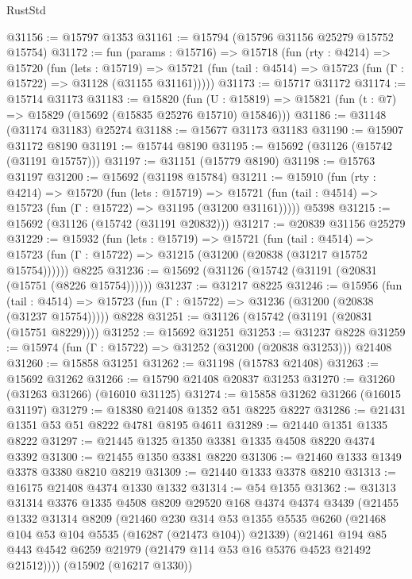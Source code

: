 \begin{lexlean}{RustStd}
\begin{coremodule}
@31156 := @15797 @1353
@31161 := @15794 (@15796 @31156 @25279 @15752 @15754)
@31172 := fun (params : @15716) =>
  @15718
    (fun (rty : @4214) =>
    @15720
      (fun (lets : @15719) =>
      @15721 (fun (tail : @4514) => @15723 (fun (Γ : @15722) => @31128 (@31155 @31161)))))
@31173 := @15717 @31172
@31174 := @15714 @31173
@31183 := @15820
    (fun (U : @15819) => @15821 (fun (t : @7) => @15829 (@15692 (@15835 @25276 @15710) @15846)))
@31186 := @31148 (@31174 @31183) @25274
@31188 := @15677 @31173 @31183
@31190 := @15907 @31172 @8190
@31191 := @15744 @8190
@31195 := @15692 (@31126 (@15742 (@31191 @15757)))
@31197 := @31151 (@15779 @8190)
@31198 := @15763 @31197
@31200 := @15692 (@31198 @15784)
@31211 := @15910
    (fun (rty : @4214) =>
    @15720
      (fun (lets : @15719) =>
      @15721 (fun (tail : @4514) => @15723 (fun (Γ : @15722) => @31195 (@31200 @31161)))))
    @5398
@31215 := @15692 (@31126 (@15742 (@31191 @20832)))
@31217 := @20839 @31156 @25279
@31229 := @15932
    (fun (lets : @15719) =>
    @15721
      (fun (tail : @4514) =>
      @15723 (fun (Γ : @15722) => @31215 (@31200 (@20838 (@31217 @15752 @15754))))))
    @8225
@31236 := @15692 (@31126 (@15742 (@31191 (@20831 (@15751 (@8226 @15754))))))
@31237 := @31217 @8225
@31246 := @15956
    (fun (tail : @4514) => @15723 (fun (Γ : @15722) => @31236 (@31200 (@20838 (@31237 @15754)))))
    @8228
@31251 := @31126 (@15742 (@31191 (@20831 (@15751 @8229))))
@31252 := @15692 @31251
@31253 := @31237 @8228
@31259 := @15974 (fun (Γ : @15722) => @31252 (@31200 (@20838 @31253))) @21408
@31260 := @15858 @31251
@31262 := @31198 (@15783 @21408)
@31263 := @15692 @31262
@31266 := @15790 @21408 @20837 @31253
@31270 := @31260 (@31263 @31266) (@16010 @31125)
@31274 := @15858 @31262 @31266 (@16015 @31197)
@31279 := @18380 @21408 @1352 @51 @8225 @8227
@31286 := @21431 @1351 @53 @51 @8222 @4781 @8195 @4611
@31289 := @21440 @1351 @1335 @8222
@31297 := @21445 @1325 @1350 @3381 @1335 @4508 @8220 @4374 @3392
@31300 := @21455 @1350 @3381 @8220
@31306 := @21460 @1333 @1349 @3378 @3380 @8210 @8219
@31309 := @21440 @1333 @3378 @8210
@31313 := @16175 @21408 @4374 @1330 @1332
@31314 := @54 @1355
@31362 := @31313
    @31314
    @3376
    @1335
    @4508
    @8209
    @29520
    @168
    @4374
    @4374
    @3439
    (@21455
      @1332
      @31314
      @8209
      (@21460
        @230
        @314
        @53
        @1355
        @5535
        @6260
        (@21468 @104 @53 @104 @5535 (@16287 (@21473 @104)) @21339)
        (@21461 @194 @85 @443 @4542 @6259 @21979 (@21479 @114 @53 @16 @5376 @4523 @21492 @21512))))
    (@15902 (@16217 @1330))

\end{coremodule}
\end{lexlean}
